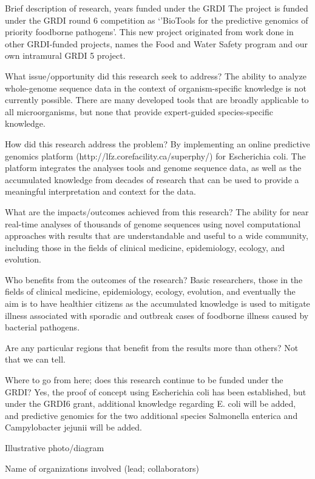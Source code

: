 Brief description of research, years funded under the GRDI
The project is funded under the GRDI round 6 competition as `'BioTools for the predictive genomics of priority foodborne pathogens'. This new project originated from work done in other GRDI-funded projects, names the Food and Water Safety program and our own intramural GRDI 5 project.

What issue/opportunity did this research seek to address?
The ability to analyze whole-genome sequence data in the context of organism-specific knowledge is not currently possible.  There are many developed tools that are broadly applicable to all microorganisms, but none that provide expert-guided species-specific knowledge.

How did this research address the problem?
By implementing an online predictive genomics platform (http://lfz.corefacility.ca/superphy/) for Escherichia coli. The platform integrates the analyses tools and genome sequence data, as well as the accumulated knowledge from decades of research that can be used to provide a meaningful interpretation and context for the data. 

What are the impacts/outcomes achieved from this research?
The ability for near real-time analyses of thousands of genome sequences using novel computational approaches with results that are understandable and useful to a wide community, including those in the fields of clinical medicine, epidemiology, ecology, and evolution.

Who benefits from the outcomes of the research?
Basic researchers,  those in the fields of clinical medicine, epidemiology, ecology, evolution, and eventually the aim is to have healthier citizens as the accumulated knowledge is used to mitigate illness associated with sporadic and outbreak cases of foodborne illness caused by bacterial pathogens.

Are any particular regions that benefit from the results more than others?
Not that we can tell.

Where to go from here; does this research continue to be funded under the GRDI?
Yes, the proof of concept using Escherichia coli has been established, but under the GRDI6 grant, additional knowledge regarding E. coli will be added, and predictive genomics for the two additional species Salmonella enterica and Campylobacter jejunii will be added.

Illustrative photo/diagram

Name of organizations involved (lead; collaborators)    



